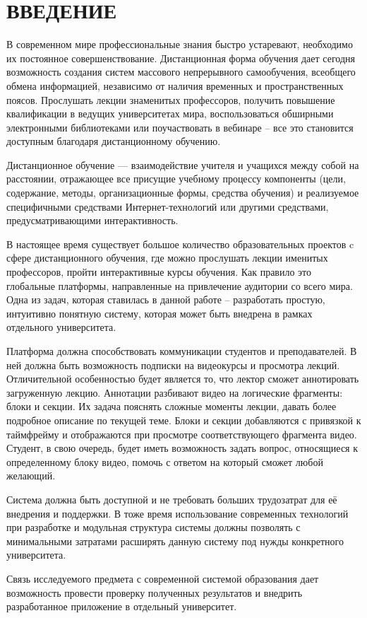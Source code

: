 \section*{ВВЕДЕНИЕ}

В современном мире профессиональные знания быстро устаревают,
необходимо их постоянное совершенствование.
Дистанционная форма обучения дает сегодня возможность создания систем массового непрерывного
самообучения, всеобщего обмена информацией,
независимо от наличия временных и пространственных поясов.
Прослушать лекции знаменитых профессоров, получить повышение квалификации
в ведущих университетах мира, воспользоваться обширными электронными библиотеками
или поучаствовать в вебинаре – все это становится доступным благодаря дистанционному обучению.

Дистанционное обучение — взаимодействие учителя и учащихся между собой на расстоянии,
отражающее все присущие учебному процессу компоненты (цели, содержание, методы,
организационные формы, средства обучения) и реализуемое специфичными средствами
Интернет-технологий или другими средствами, предусматривающими интерактивность.

В настоящее время существует большое количество образовательных проектов c сфере дистанционного
обучения, где можно прослушать лекции именитых профессоров, пройти интерактивные курсы обучения.
Как правило это глобальные платформы, направленные на привлечение аудитории со всего мира.
Одна из задач, которая ставилась в данной работе – разработать простую,
интуитивно понятную систему, которая может быть внедрена в рамках отдельного университета.


Платформа должна способствовать коммуникации студентов и преподавателей.
В ней должна быть возможность подписки на видеокурсы и просмотра лекций.
Отличительной особенностью будет является то, что лектор сможет аннотировать загруженную лекцию.
Аннотации разбивают видео на логические фрагменты: блоки и секции.
Их задача пояснять сложные моменты лекции, давать более подробное описание по текущей теме.
Блоки и секции добавляются с привязкой к таймфрейму и отображаются при просмотре соответствующего
фрагмента видео.
Студент, в свою очередь, будет иметь возможность задать вопрос, относящиеся к определенному
блоку видео, помочь с ответом на который сможет любой желающий.

Система должна быть доступной и не требовать больших трудозатрат для её внедрения и поддержки.
В тоже время использование современных технологий при разработке и модульная структура
системы должны позволять с минимальными затратами расширять данную систему под нужды
конкретного университета.

Связь исследуемого предмета с современной системой образования дает возможность
провести проверку полученных результатов и внедрить разработанное приложение в
отдельный университет.
